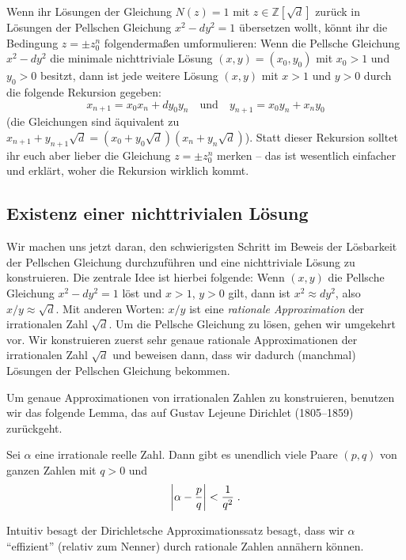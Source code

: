 Wenn ihr Lösungen der Gleichung $N(z)=1$ mit $z\in\mathbb Z[\sqrt{d}]$ zurück in Lösungen der Pellschen Gleichung $x^2-dy^2=1$ übersetzen wollt, könnt ihr die Bedingung $z=\pm z_0^n$ folgendermaßen umformulieren: Wenn die Pellsche Gleichung $x^2-dy^2$ die minimale nichttriviale Lösung $(x,y)=(x_0,y_0)$ mit $x_0>1$ und $y_0>0$ besitzt, dann ist jede weitere Lösung $(x,y)$ mit $x>1$ und $y>0$ durch die folgende Rekursion gegeben:
\begin{equation*}
	x_{n+1}=x_0x_n+dy_0y_n\quad\text{und}\quad y_{n+1}=x_0y_n+x_ny_0
\end{equation*}
(die Gleichungen sind äquivalent zu $x_{n+1}+y_{n+1}\sqrt{d}=(x_0+y_0\sqrt{d})(x_n+y_n\sqrt{d})$). Statt dieser Rekursion solltet ihr euch aber lieber die Gleichung $z=\pm z_0^n$ merken -- das ist wesentlich einfacher und erklärt, woher die Rekursion wirklich kommt.

\subsection*{Existenz einer nichttrivialen Lösung}
Wir machen uns jetzt daran, den schwierigsten Schritt im Beweis der Lösbarkeit der Pellschen Gleichung durchzuführen und eine nichttriviale Lösung zu konstruieren. Die zentrale Idee ist hierbei folgende: Wenn $(x,y)$ die Pellsche Gleichung $x^2-dy^2=1$ löst und $x>1$, $y>0$ gilt, dann ist $x^2\approx dy^2$, also $x/y\approx \sqrt{d}$. Mit anderen Worten: $x/y$ ist eine \emph{rationale Approximation} der irrationalen Zahl $\sqrt{d}$. Um die Pellsche Gleichung zu lösen, gehen wir umgekehrt vor. Wir konstruieren zuerst sehr genaue rationale Approximationen der irrationalen Zahl $\sqrt{d}$ und beweisen dann, dass wir dadurch (manchmal) Lösungen der Pellschen Gleichung bekommen.

Um genaue Approximationen von irrationalen Zahlen zu konstruieren, benutzen wir das folgende Lemma, das auf Gustav Lejeune Dirichlet (1805--1859) zurückgeht.

\begin{satzmitnamen}
	Sei $\alpha$ eine irrationale reelle Zahl. Dann gibt es unendlich viele Paare $(p,q)$ von ganzen Zahlen mit $q>0$ und
	\begin{equation*}
		\abs*{\alpha-\frac{p}{q}}<\frac{1}{q^2}\;.
	\end{equation*}
\end{satzmitnamen}
Intuitiv besagt der Dirichletsche Approximationssatz besagt, dass wir $\alpha$ \enquote{effizient} (relativ zum Nenner) durch rationale Zahlen annähern können.

